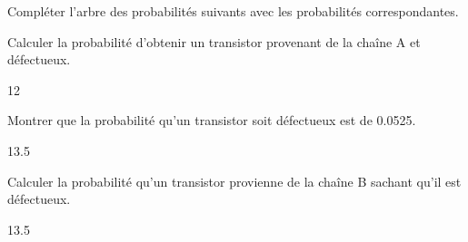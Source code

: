 \documentclass[a4paper,10pt]{report}
\begin{document}
\medskip

\begin{enumerate}[resume]

\begin{minipage}{0.62\linewidth}
    \item Compléter l'arbre des probabilités suivants avec les probabilités correspondantes.
   
    \item Calculer la probabilité d'obtenir un transistor provenant de la chaîne A et défectueux.
    \begin{answer}{1}{2}    \end{answer}
\end{minipage}\hfill
\begin{minipage}{0.36\linewidth}
    \begin{center}
            \end{center}
\end{minipage}




    
    
    
    \item Montrer que la probabilité qu'un transistor soit défectueux est de 0.0525.

    \begin{answer}{1}{3.5}    \end{answer}
    
    \item Calculer la probabilité qu'un transistor provienne de la chaîne B sachant qu'il est défectueux.
    

    \begin{answer}{1}{3.5}    \end{answer}

\end{enumerate}
\end{document}
